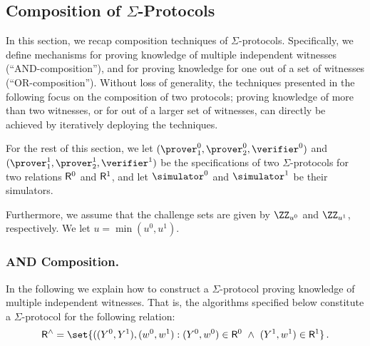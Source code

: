 \documentclass[runningheads]{llncs}
\begin{document}
\subsection{Composition of $\Sigma$-Protocols}\label{sec:composition}
  In this section, we recap composition techniques of $\Sigma$-protocols.
  Specifically, we define mechanisms for proving knowledge of multiple independent witnesses (``AND-composition''), and for proving knowledge for one out of a set of witnesses (``OR-composition'').
  Without loss of generality, the techniques presented in the following focus on the composition of two protocols;
  proving knowledge of more than two witnesses, or for out of a larger set of witnesses, can directly be achieved by iteratively deploying the techniques.

  For the rest of this section, we let $(\prover_1^0,\prover_2^0,\verifier^0)$ and $(\prover_1^1,\prover_2^1,\verifier^1)$ be the specifications of two $\Sigma$-protocols for two relations $\mathsf{R}^0$ and $\mathsf{R}^1$, and let $\simulator^0$ and $\simulator^1$ be their simulators.

  Furthermore, we assume that the challenge sets are given by $\ZZ_{u^0}$ and $\ZZ_{u^1}$, respectively.
  We let $u=\min(u^0,u^1)$.



\subsubsection{AND Composition.}
  In the following we explain how to construct a $\Sigma$-protocol proving knowledge of multiple independent witnesses.
  That is, the algorithms specified below constitute a $\Sigma$-protocol for the following relation:
\[
  \relation^\land = \set{
    ((Y^0,Y^1),(w^0,w^1) : (Y^0,w^0)\in \relation^0 ~\land~ (Y^1,w^1)\in\relation^1}\,.
\]
\end{document}
